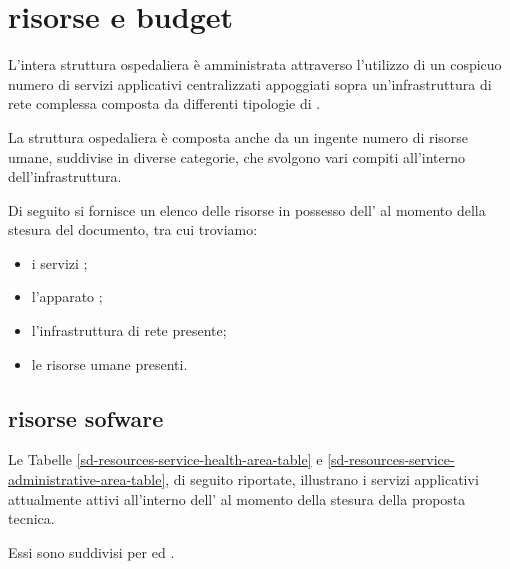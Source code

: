 %
%
\section[Risorse e budget]{risorse e budget}
\label{sd-resources}
L'intera struttura ospedaliera è amministrata attraverso l'utilizzo di un cospicuo numero di servizi applicativi centralizzati appoggiati
sopra un'infrastruttura di rete complessa composta da differenti tipologie di .

La struttura ospedaliera è composta anche da un ingente numero di risorse umane, suddivise in diverse categorie, che svolgono vari compiti all'interno dell'infrastruttura.

Di seguito si fornisce un elenco delle risorse in possesso dell'\entity{} al momento della stesura del documento, tra cui troviamo:

\begin{itemize}
\item{i servizi ;}
\item{l'apparato ;}
\item{l'infrastruttura di rete presente;}
\item{le risorse umane presenti.}
\end{itemize}

\subsection[Risorse software]{risorse sofware}
\label{sd-resources-software}
Le Tabelle \ref{sd-resources-service-health-area-table} e \ref{sd-resources-service-administrative-area-table}, di seguito riportate, illustrano i servizi applicativi attualmente attivi all'interno dell'\entity{} al momento della stesura della proposta tecnica. 

Essi sono suddivisi per  ed .

